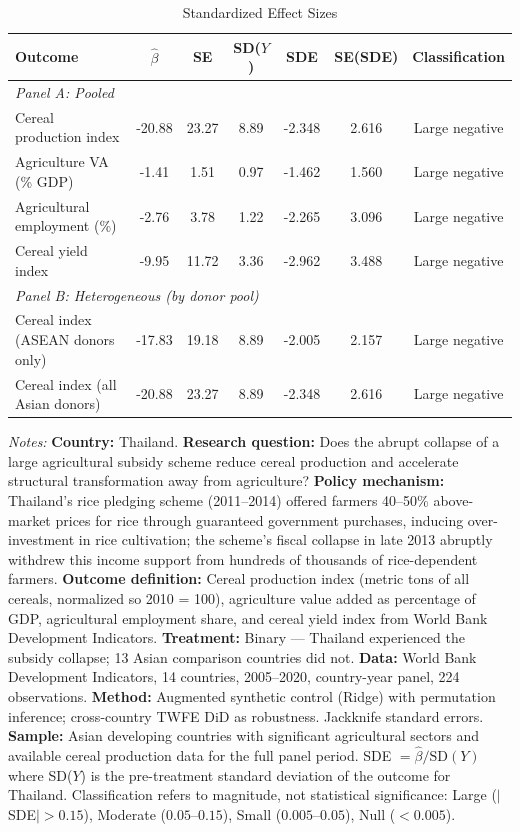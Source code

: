 \begin{table}[htbp]
\centering
\begin{threeparttable}
\caption{Standardized Effect Sizes}
\label{tab:sde}
\footnotesize
\begin{tabular}{lcccccc}
\toprule
  Outcome & $\hat{\beta}$ & SE & SD($Y$) & SDE & SE(SDE) & Classification \\
\midrule
  \multicolumn{7}{l}{\textit{Panel A: Pooled}} \\
  Cereal production index & -20.88 & 23.27 & 8.89 & -2.348 & 2.616 & Large negative \\
  Agriculture VA (\% GDP) & -1.41 & 1.51 & 0.97 & -1.462 & 1.560 & Large negative \\
  Agricultural employment (\%) & -2.76 & 3.78 & 1.22 & -2.265 & 3.096 & Large negative \\
  Cereal yield index & -9.95 & 11.72 & 3.36 & -2.962 & 3.488 & Large negative \\
  \multicolumn{7}{l}{\textit{Panel B: Heterogeneous (by donor pool)}} \\
  Cereal index (ASEAN donors only) & -17.83 & 19.18 & 8.89 & -2.005 & 2.157 & Large negative \\
  Cereal index (all Asian donors) & -20.88 & 23.27 & 8.89 & -2.348 & 2.616 & Large negative \\
\bottomrule
\end{tabular}
\begin{tablenotes}[flushleft]\footnotesize
\item \textit{Notes:} \textbf{Country:} Thailand. \textbf{Research question:} Does the abrupt collapse of a large agricultural subsidy scheme reduce cereal production and accelerate structural transformation away from agriculture? \textbf{Policy mechanism:} Thailand's rice pledging scheme (2011--2014) offered farmers 40--50\% above-market prices for rice through guaranteed government purchases, inducing over-investment in rice cultivation; the scheme's fiscal collapse in late 2013 abruptly withdrew this income support from hundreds of thousands of rice-dependent farmers. \textbf{Outcome definition:} Cereal production index (metric tons of all cereals, normalized so 2010 = 100), agriculture value added as percentage of GDP, agricultural employment share, and cereal yield index from World Bank Development Indicators. \textbf{Treatment:} Binary --- Thailand experienced the subsidy collapse; 13 Asian comparison countries did not. \textbf{Data:} World Bank Development Indicators, 14 countries, 2005--2020, country-year panel, 224 observations. \textbf{Method:} Augmented synthetic control (Ridge) with permutation inference; cross-country TWFE DiD as robustness. Jackknife standard errors. \textbf{Sample:} Asian developing countries with significant agricultural sectors and available cereal production data for the full panel period. SDE $= \hat{\beta} / \text{SD}(Y)$ where SD($Y$) is the pre-treatment standard deviation of the outcome for Thailand. Classification refers to magnitude, not statistical significance: Large ($|$SDE$| > 0.15$), Moderate ($0.05$--$0.15$), Small ($0.005$--$0.05$), Null ($< 0.005$).
\end{tablenotes}
\end{threeparttable}
\end{table}
